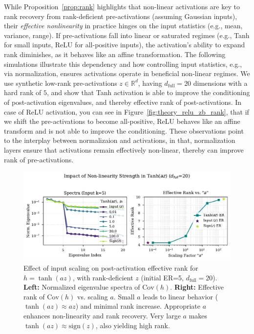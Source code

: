 \documentclass{article}
\newcommand{\R}{\mathbb{R}}
\begin{document}
While Proposition~\ref{prop:rank} highlights that non-linear activations are key to rank recovery from rank-deficient pre-activations (assuming Gaussian inputs), their \emph{effective nonlinearity} in practice hinges on the input statistics (e.g., mean, variance, range). If pre-activations fall into linear or saturated regimes (e.g., Tanh for small inputs, ReLU for all-positive inputs), the activation's ability to expand rank diminishes, as it behaves like an affine transformation. The following simulations illustrate this dependency and how controlling input statistics, e.g., via normalization, ensures activations operate in beneficial non-linear regimes. We use synthetic low-rank pre-activations $z \in \R^{d}$, having $d_{\text{full}}=20$ dimensions with a hard rank of $5$, and show that Tanh activation is able to improve the conditioning of post-activation eigenvalues, and thereby effective rank of post-activations. In case of ReLU activation, you can see in Figure~\ref{fig:theory_relu_zb_rank}, that if we shift the pre-activations to become all-positive, ReLU behaves like an affine transform and is not able to improve the conditioning. These observations point to the interplay between normalizaion and activations, in that, normalization layers ensure that activations remain effectively non-linear, thereby can improve rank of pre-activations. 

\begin{figure}[ht!]
    \centering
    \includegraphics[width=0.7\linewidth]{figures/theory_tanh_az_rank.pdf} %
    \caption{Effect of input scaling on post-activation effective rank for $h = \tanh(az)$, with rank-deficient $z$ (initial ER=5, $d_{\text{full}}=20$). \textbf{Left:} Normalized eigenvalue spectra of $\mathrm{Cov}(h)$. \textbf{Right:} Effective rank of $\mathrm{Cov}(h)$ vs. scaling $a$. Small $a$ leads to linear behavior ($\tanh(az) \approx az$) and minimal rank increase. Appropriate $a$ enhances non-linearity and rank recovery. Very large $a$ makes $\tanh(az) \approx \mathrm{sign}(z)$, also yielding high rank.}
    \label{fig:theory_tanh_az_rank}
\end{figure}
\end{document}
